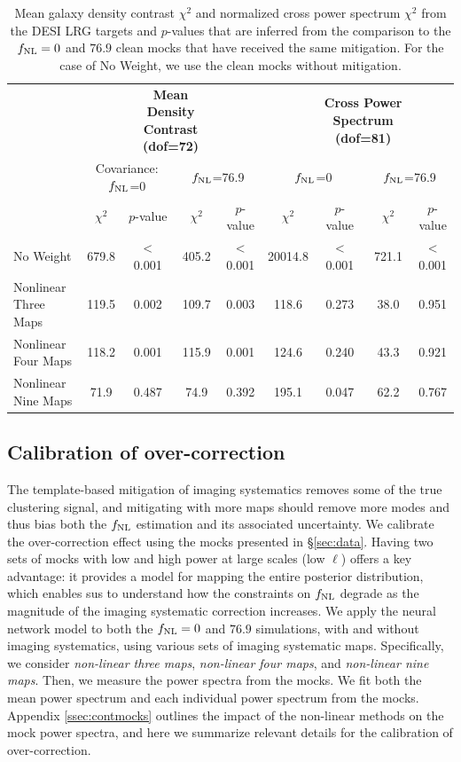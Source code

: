 \begin{table}
  \caption{Mean galaxy density contrast $\chi^{2}$ and normalized cross power spectrum $\chi^{2}$ from the DESI LRG targets and $p$-values that are inferred from the comparison to the $f_{\rm NL}=0$ and $76.9$ clean mocks that have received the same mitigation. For the case of No Weight, we use the clean mocks without mitigation.}\label{tab:chi2test}
  \begin{tabular}{lcccc|cccc}
    \hline
    \hline
    \multirow{3}{*}{} &&
      \multicolumn{2}{c}{\textbf{Mean Density Contrast (dof=72)}} & & &
      \multicolumn{2}{c}{\textbf{Cross Power Spectrum (dof=81)}} \\
    & \multicolumn{2}{c}{Covariance: $f_{\rm NL}$=0} & \multicolumn{2}{c}{$f_{\rm NL}$=76.9} & \multicolumn{2}{c}{$f_{\rm NL}$=0} & \multicolumn{2}{c}{$f_{\rm NL}$=76.9} \\
    \hline
    \textbf{Method} & $\chi^{2}$ & $p$-value & $\chi^{2}$ & $p$-value & $\chi^{2}$ & $p$-value & $\chi^{2}$ & $p$-value \\
    \hline
No Weight & 679.8 & < 0.001 & 405.2 & < 0.001 & 20014.8 & < 0.001 & 721.1 & < 0.001 \\
Nonlinear Three Maps & 119.5 & 0.002 & 109.7 & 0.003 & 118.6 & 0.273 & 38.0 & 0.951 \\
Nonlinear Four Maps & 118.2 & 0.001 & 115.9 & 0.001 & 124.6 & 0.240 & 43.3 & 0.921 \\
Nonlinear Nine Maps & 71.9 & 0.487 & 74.9 & 0.392 & 195.1 & 0.047 & 62.2 & 0.767 \\
    \hline
  \end{tabular}
\end{table}


\subsection{Calibration of over-correction}\label{ssec:calibration}

The template-based mitigation of imaging systematics removes some of the true clustering signal, and mitigating with more maps should remove more modes and thus bias both the $f_{\rm NL}$ estimation and its associated uncertainty. We calibrate the over-correction effect using the mocks presented in \S \ref{sec:data}. Having two sets of mocks with low and high power at large scales (low $\ell$) offers a key advantage: it provides a model for mapping the entire posterior distribution, which enables sus to understand how the constraints on $f_{\rm NL}$ degrade as the magnitude of the imaging systematic correction increases.  We apply the neural network model to both the $f_{\rm NL}=0$ and $76.9$ simulations, with and without imaging systematics, using various sets of imaging systematic maps. Specifically, we consider \textit{non-linear three maps}, \textit{non-linear four maps}, and \textit{non-linear nine maps}. Then, we measure the power spectra from the mocks. We fit both the mean power spectrum and each individual power spectrum from the mocks. Appendix \ref{ssec:contmocks} outlines the impact of the non-linear methods on the mock power spectra, and here we summarize relevant details for the calibration of over-correction.

